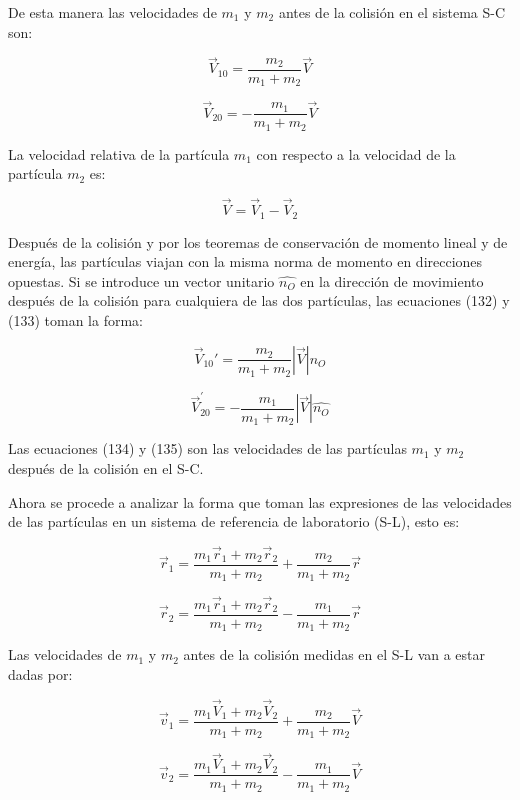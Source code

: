 \documentclass[]{article}
\begin{document}
De esta manera las velocidades de \(m_{1}\) y \(m_{2}\) antes de la
colisión en el sistema S-C son:

\[{\overrightarrow{V}}_{10} = \frac{m_{2}}{m_{1} + m_{2}}\overrightarrow{V}\]

\[{\overrightarrow{V}}_{20} = - \frac{m_{1}}{m_{1} + m_{2}}\overrightarrow{V}\]

La velocidad relativa de la partícula \(m_{1}\) con respecto a la
velocidad de la partícula \(m_{2}\) es:

\[\overrightarrow{V} = {\overrightarrow{V}}_{1} - {\overrightarrow{V}}_{2}\]

Después de la colisión y por los teoremas de conservación de momento
lineal y de energía, las partículas viajan con la misma norma de momento
en direcciones opuestas. Si se introduce un vector unitario
\(\widehat{n_{O}}\) en la dirección de movimiento después de la colisión
para cualquiera de las dos partículas, las ecuaciones (132) y (133)
toman la forma:

\[{\overrightarrow{V}}_{10}' = \frac{m_{2}}{m_{1} + m_{2}}\left| \overrightarrow{V} \right|\widehat{n_{O}}\]

\[{\overrightarrow{V}}_{20}^{'} = - \frac{m_{1}}{m_{1} + m_{2}}\left| \overrightarrow{V} \right|\widehat{n_{O}}\]

Las ecuaciones (134) y (135) son las velocidades de las partículas
\(m_{1}\) y \(m_{2}\) después de la colisión en el S-C.

Ahora se procede a analizar la forma que toman las expresiones de las
velocidades de las partículas en un sistema de referencia de laboratorio
(S-L), esto es:

\[{\overrightarrow{r}}_{1} = \frac{m_{1}{\overrightarrow{r}}_{1} + m_{2}{\overrightarrow{r}}_{2}}{m_{1} + m_{2}} + \frac{m_{2}}{m_{1} + m_{2}}\overrightarrow{r}\]

\[{\overrightarrow{r}}_{2} = \frac{m_{1}{\overrightarrow{r}}_{1} + m_{2}{\overrightarrow{r}}_{2}}{m_{1} + m_{2}} - \frac{m_{1}}{m_{1} + m_{2}}\overrightarrow{r}\]

Las velocidades de \(m_{1}\) y \(m_{2}\) antes de la colisión medidas en
el S-L van a estar dadas por:

\[{\overrightarrow{v}}_{1} = \frac{m_{1}{\overrightarrow{V}}_{1} + m_{2}{\overrightarrow{V}}_{2}}{m_{1} + m_{2}} + \frac{m_{2}}{m_{1} + m_{2}}\overrightarrow{V}\]

\[{\overrightarrow{v}}_{2} = \frac{m_{1}{\overrightarrow{V}}_{1} + m_{2}{\overrightarrow{V}}_{2}}{m_{1} + m_{2}} - \frac{m_{1}}{m_{1} + m_{2}}\overrightarrow{V}\]
\end{document}
